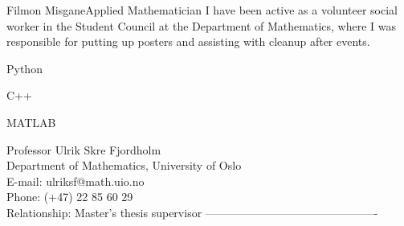 \documentclass{article}
\begin{document}
\begin{cv}{Filmon Misgane}{Applied Mathematician}
    I have been active as a volunteer social worker in the Student Council at the Department of Mathematics, where I was responsible for putting up posters and assisting with cleanup after events.\\

    \begin{cvitem} Python \end{cvitem}
    \begin{cvitem} C++ \end{cvitem}
    \begin{cvitem} MATLAB \end{cvitem}
    \cvseparator
    Professor Ulrik Skre Fjordholm  \\
    Department of Mathematics, University of Oslo  \\
    E-mail: ulriksf@math.uio.no  \\
    Phone: (+47) 22 85 60 29  \\
    Relationship: Master's thesis supervisor
    ----------------------------------------------\\
\end{cv}
\end{document}
